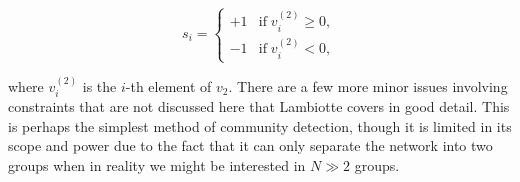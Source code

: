 $$ s_i = \begin{cases}
    +1 & \text{if} \; v_i^{(2)} \geq 0, \\
    -1 & \text{if} \; v_i^{(2)} < 0,
\end{cases} $$

where $v_i^{(2)}$ is the $i$-th element of $v_2$. There are a few more minor issues involving constraints that are not discussed here that Lambiotte covers in good detail.\cite[27]{oxford:renaud_notes} This is perhaps the simplest method of community detection, though it is limited in its scope and power due to the fact that it can only separate the network into two groups when in reality we might be interested in $N \gg 2$ groups.

